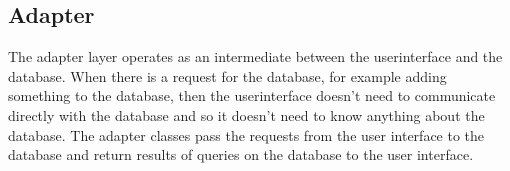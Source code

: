 \subsection{Adapter}
The adapter layer operates as an intermediate between the userinterface and the database. When there is a request for the database, for example adding something to the database, then the userinterface doesn't need to communicate directly with the database and so it doesn't need to know anything about the database. The adapter classes pass the requests from the user interface to the database and return results of queries on the database to the user interface.